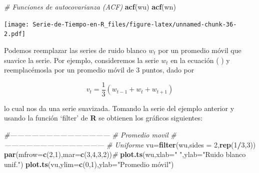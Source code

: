 \documentclass[12pt,]{krantz}
\makeatletter
\newenvironment{Shaded}{\begin{snugshade}}{\end{snugshade}}
\newcommand{\KeywordTok}[1]{\textcolor[rgb]{0.13,0.29,0.53}{\textbf{#1}}}
\newcommand{\DataTypeTok}[1]{\textcolor[rgb]{0.13,0.29,0.53}{#1}}
\newcommand{\DecValTok}[1]{\textcolor[rgb]{0.00,0.00,0.81}{#1}}
\newcommand{\StringTok}[1]{\textcolor[rgb]{0.31,0.60,0.02}{#1}}
\newcommand{\CommentTok}[1]{\textcolor[rgb]{0.56,0.35,0.01}{\textit{#1}}}
\newcommand{\OperatorTok}[1]{\textcolor[rgb]{0.81,0.36,0.00}{\textbf{#1}}}
\newcommand{\NormalTok}[1]{#1}
\newenvironment{kframe}{%
\medskip{}
\setlength{\fboxsep}{.8em}
 \def\at@end@of@kframe{}%
 \ifinner\ifhmode%
  \def\at@end@of@kframe{\end{minipage}}%
  \begin{minipage}{\columnwidth}%
 \fi\fi%
 \def\FrameCommand##1{\hskip\@totalleftmargin \hskip-\fboxsep
 \colorbox{shadecolor}{##1}\hskip-\fboxsep
     \hskip-\linewidth \hskip-\@totalleftmargin \hskip\columnwidth}%
 \MakeFramed {\advance\hsize-\width
   \@totalleftmargin\z@ \linewidth\hsize
   \@setminipage}}%
 {\par\unskip\endMakeFramed%
 \at@end@of@kframe}
\renewenvironment{Shaded}{\begin{kframe}}{\end{kframe}}
\theoremstyle{definition}
\theoremstyle{definition}
\theoremstyle{definition}
\theoremstyle{remark}
\let\BeginKnitrBlock\begin \let\EndKnitrBlock\end
\makeatother
\begin{document}
\begin{Shaded}
\begin{Highlighting}[]
\CommentTok{# Funciones de autocovarianza (ACF)}
\KeywordTok{acf}\NormalTok{(wu)}
\KeywordTok{acf}\NormalTok{(wn)}
\end{Highlighting}
\end{Shaded}

\texttt{[image: Serie-de-Tiempo-en-R\_files/figure-latex/unnamed-chunk-36-2.pdf]}

\BeginKnitrBlock{example}
\protect\hypertarget{exm:ejem-promedio-movil-ruido-blanco}{}{\label{exm:ejem-promedio-movil-ruido-blanco}
}Podemos reemplazar las series de ruido blanco \(w_t\) por un promedio
móvil que suavice la serie. Por ejemplo, consideremos la serie \(w_t\)
en la ecuación ( ) y reemplacémosla por un promedio móvil de 3 puntos,
dado por

\begin{equation}
v_t = \frac{1}{3}(w_{t-1}+w_t+w_{t+1})
\label{eq:eq-promedio-movil-ruido-blanco}
\end{equation}

lo cual nos da una serie suavizada. Tomando la serie del ejemplo
anterior y usando la función `filter' de \textbf{R} se obtienen los
gráficos siguientes:
\EndKnitrBlock{example}

\begin{Shaded}
\begin{Highlighting}[]
\CommentTok{#------------------------------------------}
\CommentTok{# Promedio movil}
\CommentTok{#------------------------------------------}
\CommentTok{# Uniforme}
\NormalTok{vu=}\KeywordTok{filter}\NormalTok{(wu,}\DataTypeTok{sides =} \DecValTok{2}\NormalTok{,}\KeywordTok{rep}\NormalTok{(}\DecValTok{1}\OperatorTok{/}\DecValTok{3}\NormalTok{,}\DecValTok{3}\NormalTok{))}
\KeywordTok{par}\NormalTok{(}\DataTypeTok{mfrow=}\KeywordTok{c}\NormalTok{(}\DecValTok{2}\NormalTok{,}\DecValTok{1}\NormalTok{),}\DataTypeTok{mar=}\KeywordTok{c}\NormalTok{(}\DecValTok{3}\NormalTok{,}\DecValTok{4}\NormalTok{,}\DecValTok{3}\NormalTok{,}\DecValTok{2}\NormalTok{))}\CommentTok{#}
\KeywordTok{plot.ts}\NormalTok{(wu,}\DataTypeTok{xlab=}\StringTok{" "}\NormalTok{,}\DataTypeTok{ylab=}\StringTok{"Ruido blanco unif."}\NormalTok{)}
\KeywordTok{plot.ts}\NormalTok{(vu,}\DataTypeTok{ylim=}\KeywordTok{c}\NormalTok{(}\DecValTok{0}\NormalTok{,}\DecValTok{1}\NormalTok{),}\DataTypeTok{ylab=}\StringTok{"Promedio móvil")}
\end{Highlighting}
\end{Shaded}
\end{document}
